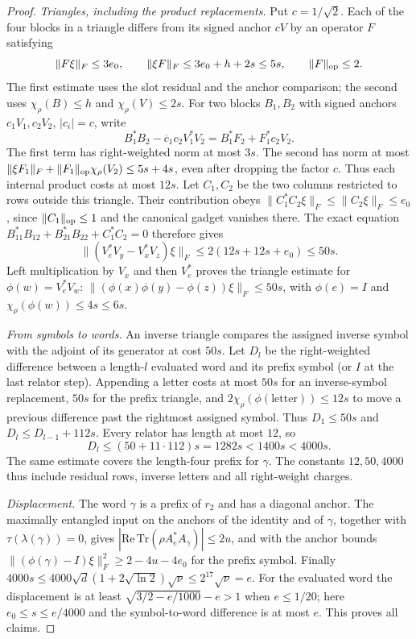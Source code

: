 \documentclass[11pt,a4paper]{article}
\theoremstyle{plain}
\theoremstyle{definition}
\theoremstyle{remark}
\begin{document}
\begin{proof}
\emph{Triangles, including the product replacements.} Put $c=1/\sqrt2$. Each of the four blocks in a triangle differs from its signed
anchor $cV$ by an operator $F$ satisfying
\[
\|F\xi\|_F\le3e_0,\qquad \|\xi F\|_F\le3e_0+h+2s\le5s,\qquad \|F\|_{\rm op}\le2.
\]
The first estimate uses the slot residual and the anchor comparison; the second uses
$\chi_\rho(B)\le h$ and $\chi_\rho(V)\le2s$. For two blocks $B_1,B_2$ with signed anchors $c_1V_1,c_2V_2$, $|c_i|=c$, write
\[
B_1^*B_2-\overline c_1c_2V_1^*V_2=B_1^*F_2+F_1^*c_2V_2.
\]
The first term has right-weighted norm at most $3s$. The second has norm at most
$\|\xi F_1\|_F+\|F_1\|_{\rm op}\chi_\rho(V_2)\le5s+4s$, even after dropping the factor $c$.
Thus each internal product costs at most $12s$.
Let $C_1,C_2$ be the two columns restricted to rows outside this triangle. Their contribution obeys
$\|C_1^*C_2\xi\|_F\le\|C_2\xi\|_F\le e_0$, since $\|C_1\|_{\rm op}\le1$ and the canonical gadget vanishes there.
The exact equation $B_{11}^*B_{12}+B_{21}^*B_{22}+C_1^*C_2=0$ therefore gives
\[
\|(V_e^*V_y-V_x^*V_z)\xi\|_F\le2(12s+12s+e_0)\le50s.
\]
Left multiplication by $V_x$ and then $V_e^*$ proves the triangle estimate for $\phi(w)=V_e^*V_w$:
$\|(\phi(x)\phi(y)-\phi(z))\xi\|_F\le50s$, with $\phi(e)=I$ and $\chi_\rho(\phi(w))\le4s\le6s$.

\emph{From symbols to words.} An inverse triangle compares the assigned inverse symbol with the adjoint of its generator at cost $50s$.
Let $D_l$ be the right-weighted difference between a length-$l$ evaluated word and its prefix symbol (or $I$ at the last relator step).
Appending a letter costs at most $50s$ for an inverse-symbol replacement, $50s$ for the prefix triangle, and
$2\chi_\rho(\phi(\text{letter}))\le12s$ to move a previous difference past the rightmost assigned symbol.
Thus $D_1\le50s$ and $D_l\le D_{l-1}+112s$. Every relator has length at most $12$, so
\[
D_l\le(50+11\cdot112)s=1282s<1400s<4000s.
\]
The same estimate covers the length-four prefix for $\gamma$. The constants $12,50,4000$ thus include residual rows, inverse letters and all right-weight charges.

\emph{Displacement.} The word $\gamma$ is a prefix of $r_2$ and has a diagonal anchor. The maximally entangled input on the anchors of
the identity and of $\gamma$, together with $\tau(\lambda(\gamma))=0$, gives $|\mathrm{Re}\,\mathrm{Tr}(\rho A_e^*A_\gamma)|\le2u$, and with the anchor
bounds $\|(\phi(\gamma)-I)\xi\|_F^2\ge2-4u-4e_0$ for the prefix symbol. Finally
$4000s\le4000\sqrt d(1+2\sqrt{\ln2})\sqrt\nu\le2^{17}\sqrt\nu=e$.
For the evaluated word the displacement is at least $\sqrt{3/2-e/1000}-e>1$ when $e\le1/20$;
here $e_0\le s\le e/4000$ and the symbol-to-word difference is at most $e$. This proves all claims.
\end{proof}
\end{document}
